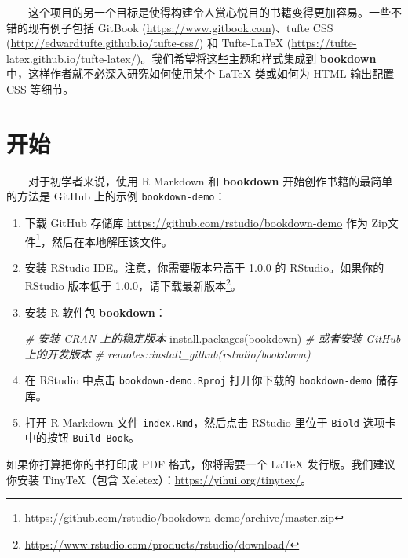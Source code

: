 \documentclass[
  12pt,
]{krantz}
\makeatletter
\newenvironment{Shaded}{\begin{snugshade}}{\end{snugshade}}
\newcommand{\CommentTok}[1]{\textcolor[rgb]{0.56,0.35,0.01}{\textit{#1}}}
\newcommand{\FunctionTok}[1]{\textcolor[rgb]{0.00,0.00,0.00}{#1}}
\newcommand{\NormalTok}[1]{#1}
\newcommand{\StringTok}[1]{\textcolor[rgb]{0.31,0.60,0.02}{#1}}
\renewcommand{\href}[2]{#2\footnote{\url{#1}}}
\newenvironment{kframe}{%
\medskip{}
\setlength{\fboxsep}{.8em}
 \def\at@end@of@kframe{}%
 \ifinner\ifhmode%
  \def\at@end@of@kframe{\end{minipage}}%
  \begin{minipage}{\columnwidth}%
 \fi\fi%
 \def\FrameCommand##1{\hskip\@totalleftmargin \hskip-\fboxsep
 \colorbox{shadecolor}{##1}\hskip-\fboxsep
     \hskip-\linewidth \hskip-\@totalleftmargin \hskip\columnwidth}%
 \MakeFramed {\advance\hsize-\width
   \@totalleftmargin\z@ \linewidth\hsize
   \@setminipage}}%
 {\par\unskip\endMakeFramed%
 \at@end@of@kframe}
\newenvironment{rmdblock}[1]
  {
  \begin{itemize}
  \renewcommand{\labelitemi}{
    \raisebox{-.7\height}[0pt][0pt]{
      {\setkeys{Gin}{width=3em,keepaspectratio}\texttt{[image: images/\#1]}}
    }
  }
  \setlength{\fboxsep}{1em}
  \begin{kframe}
  \item
  }
  {
  \end{kframe}
  \end{itemize}
  }
\newenvironment{rmdnote}
  {\begin{rmdblock}{note}}
  {\end{rmdblock}}
\theoremstyle{definition}
\theoremstyle{definition}
\theoremstyle{definition}
\theoremstyle{definition}
\theoremstyle{remark}
\makeatother
\begin{document}
  这个项目的另一个目标是使得构建令人赏心悦目的书籍变得更加容易。一些不错的现有例子包括 GitBook (\url{https://www.gitbook.com})、tufte CSS (\url{http://edwardtufte.github.io/tufte-css/}) 和 Tufte-LaTeX (\url{https://tufte-latex.github.io/tufte-latex/})。我们希望将这些主题和样式集成到 \textbf{bookdown} 中，这样作者就不必深入研究如何使用某个 LaTeX 类或如何为 HTML 输出配置 CSS 等细节。

\hypertarget{ux5f00ux59cb}{%
\section{开始}\label{ux5f00ux59cb}}

  对于初学者来说，使用 R Markdown 和 \textbf{bookdown} 开始创作书籍的最简单的方法是 GitHub 上的示例 \texttt{bookdown-demo}：

\begin{enumerate}
\def\labelenumi{\arabic{enumi}.}
\item
  下载 GitHub 存储库 \url{https://github.com/rstudio/bookdown-demo} 作为 \href{https://github.com/rstudio/bookdown-demo/archive/master.zip}{Zip文件}，然后在本地解压该文件。
\item
  安装 RStudio IDE。注意，你需要版本号高于 1.0.0 的 RStudio。如果你的 RStudio 版本低于 1.0.0，请\href{https://www.rstudio.com/products/rstudio/download/}{下载最新版本}。
\item
  安装 R 软件包 \textbf{bookdown}：

\begin{Shaded}
\begin{Highlighting}[]
\CommentTok{\# 安装 CRAN 上的稳定版本}
\FunctionTok{install.packages}\NormalTok{(}\StringTok{\textquotesingle{}bookdown\textquotesingle{}}\NormalTok{)}
\CommentTok{\# 或者安装 GitHub 上的开发版本}
\CommentTok{\# remotes::install\_github(\textquotesingle{}rstudio/bookdown\textquotesingle{})}
\end{Highlighting}
\end{Shaded}
\item
  在 RStudio 中点击 \texttt{bookdown-demo.Rproj} 打开你下载的 \texttt{bookdown-demo} 储存库。
\item
  打开 R Markdown 文件 \texttt{index.Rmd}，然后点击 RStudio 里位于 \texttt{Biold} 选项卡中的按钮 \texttt{Build\ Book}。
\end{enumerate}

\begin{rmdnote}
如果你打算把你的书打印成 PDF 格式，你将需要一个 LaTeX 发行版。我们建议你安装 TinyTeX（包含 Xeletex）：\url{https://yihui.org/tinytex/}。
\end{rmdnote}
\end{document}
